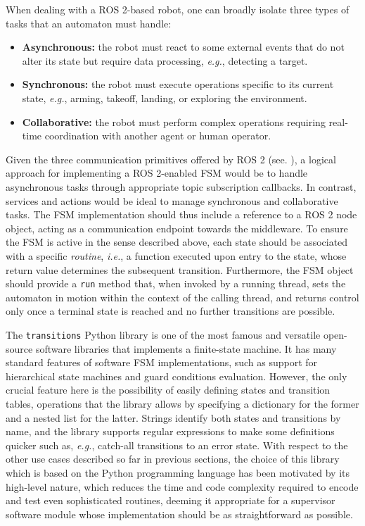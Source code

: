 When dealing with a ROS 2-based robot, one can broadly isolate three types of tasks that an automaton must handle:
\begin{itemize}
  \item \textbf{Asynchronous:} the robot must react to some external events that do not alter its state but require data processing, \emph{e.g.}, detecting a target.
  \item \textbf{Synchronous:} the robot must execute operations specific to its current state, \emph{e.g.}, arming, takeoff, landing, or exploring the environment.
  \item \textbf{Collaborative:} the robot must perform complex operations requiring real-time coordination with another agent or human operator.
\end{itemize}
Given the three communication primitives offered by ROS 2 (see. ), a logical approach for implementing a ROS 2-enabled FSM would be to handle asynchronous tasks through appropriate topic subscription callbacks. In contrast, services and actions would be ideal to manage synchronous and collaborative tasks. The FSM implementation should thus include a reference to a ROS 2 node object, acting as a communication endpoint towards the middleware. To ensure the FSM is active in the sense described above, each state should be associated with a specific \emph{routine}, \emph{i.e.}, a function executed upon entry to the state, whose return value determines the subsequent transition. Furthermore, the FSM object should provide a \texttt{run} method that, when invoked by a running thread, sets the automaton in motion within the context of the calling thread, and returns control only once a terminal state is reached and no further transitions are possible.

The \texttt{transitions} \cite{yarkoni_transitions_2017} Python library is one of the most famous and versatile open-source software libraries that implements a finite-state machine. It has many standard features of software FSM implementations, such as support for hierarchical state machines and guard conditions evaluation. However, the only crucial feature here is the possibility of easily defining states and transition tables, operations that the library allows by specifying a dictionary for the former and a nested list for the latter. Strings identify both states and transitions by name, and the library supports regular expressions to make some definitions quicker such as, \emph{e.g.}, catch-all transitions to an error state. With respect to the other use cases described so far in previous sections, the choice of this library which is based on the Python programming language has been motivated by its high-level nature, which reduces the time and code complexity required to encode and test even sophisticated routines, deeming it appropriate for a supervisor software module whose implementation should be as straightforward as possible.

